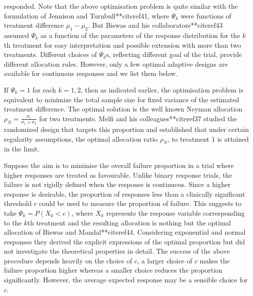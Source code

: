responded. Note that the above optimisation problem is quite similar
with the formulation of Jennison and Turnbull**citeref{41}, where
$\Psi_{k}$ were functions of treatment difference $\mu_1-\mu_2$. But
Biswas and his collaborators**citeref{43} assumed $\Psi_{k}$ as a function of the
parameters of the response distribution for the $k$th treatment for
easy interpretation and possible extension with more than two
treatments. Different choices of $\Psi_{k}$s, reflecting different
goal of the trial, provide different allocation rules. However, only
a few optimal adaptive designs are available for continuous
responses and we list them below.

If $\Psi_{k}=1$ for each $k=1,2$, then  as indicated earlier, the optimisation problem is equivalent to minimize the total sample size for fixed variance
of the estimated treatment difference. The optimal solution is the
well known Neyman allocation $\rho_{N}=\frac{\sigma_{1}}{\sigma_{1}+\sigma_{2}}$ for two treatments. Melfi and his colleagues**citeref{37} studied the randomized design that
targets this proportion and established that under certain regularity
assumptions, the optimal allocation ratio $\rho_{N}$, to treatment 1
is attained in the limit.

Suppose the aim is to minimise the overall failure proportion in a
trial where higher responses are treated as favourable. Unlike
binary response trials, the failure is not rigidly defined when the
response is continuous. Since a higher response is desirable, the
proportion of responses less than a clinically significant threshold
$c$ could be used to measure the proportion of failure. This suggests
to take $\Psi_{k}=P(X_{k}<c)$, where $X_{k}$ represents the response
variable corresponding to the $k$th treatment and the resulting
allocation is nothing but the optimal allocation of Biswas and
Mandal**citeref{44}. Considering exponential and normal responses they derived the explicit expressions of the optimal proportion but did
not investigate the theoretical properties in detail. The success of
the above procedure depends heavily on the choice of $c$, a larger
choice of $c$ makes the failure proportion higher whereas a smaller
choice reduces the proportion significantly. However, the average
expected response may be a sensible
choice for $c$.

